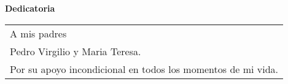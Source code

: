 %
%
%
%
%




\pagestyle{empty}

\noindent \mbox{{\huge \textbf{Dedicatoria}}}


\vspace{2cm}

\noindent
\begin{tabular}{p{13.2cm}}
\hline \hline

\medskip

A mis padres\\

Pedro Virgilio y Maria Teresa.\\

Por su apoyo incondicional en todos los momentos de mi vida.


\medskip
\end{tabular}





\newpage \thispagestyle{empty} \cleardoublepage
